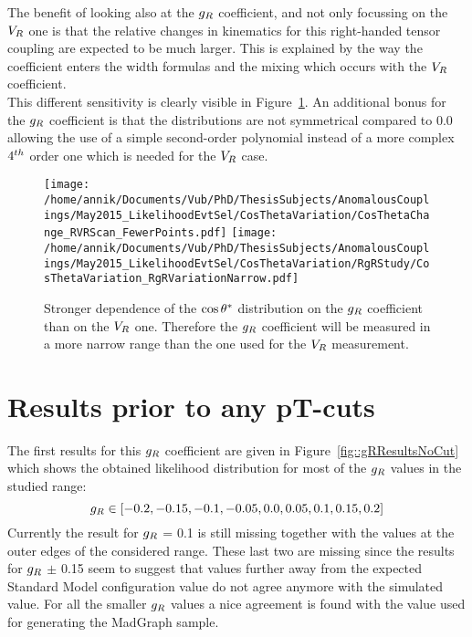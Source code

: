 The benefit of looking also at the $g_{R}$ coefficient, and not only focussing on the $V_{R}$ one is that the relative changes in kinematics for this right-handed tensor coupling are expected to be much larger. This is explained by the way the coefficient enters the width formulas and the mixing which occurs with the $V_{R}$ coefficient.\\
This different sensitivity is clearly visible in Figure~\ref{fig::VRvsgR}. An additional bonus for the $g_{R}$ coefficient is that the distributions are not symmetrical compared to 0.0 allowing the use of a simple second-order polynomial instead of a more complex $4^{th}$ order one which is needed for the $V_{R}$ case.

\begin{figure}[h!t]
 \centering
 \texttt{[image: /home/annik/Documents/Vub/PhD/ThesisSubjects/AnomalousCouplings/May2015\_LikelihoodEvtSel/CosThetaVariation/CosThetaChange\_RVRScan\_FewerPoints.pdf]}
 \texttt{[image: /home/annik/Documents/Vub/PhD/ThesisSubjects/AnomalousCouplings/May2015\_LikelihoodEvtSel/CosThetaVariation/RgRStudy/CosThetaVariation\_RgRVariationNarrow.pdf]}
 \caption{Stronger dependence of the $\cos \theta^{*}$ distribution on the $g_{R}$ coefficient than on the $V_{R}$ one. Therefore the $g_{R}$ coefficient will be measured in a more narrow range than the one used for the $V_{R}$ measurement.}
 \label{fig::VRvsgR}
\end{figure}

\section{Results prior to any pT-cuts}

The first results for this $g_{R}$ coefficient are given in Figure~\ref{fig::gRResultsNoCut} which shows the obtained likelihood distribution for most of the $g_{R}$ values in the studied range:
\begin{equation}
 g_{R} \in \left[-0.2, -0.15, -0.1, -0.05, 0.0, 0.05, 0.1, 0.15, 0.2 \right]
\end{equation}
Currently the result for $g_{R}$ = 0.1 is still missing together with the values at the outer edges of the considered range. These last two are missing since the results for $g_{R}$ $\pm$ 0.15 seem to suggest that values further away from the expected Standard Model configuration value do not agree anymore with the simulated value. For all the smaller $g_{R}$ values a nice agreement is found with the value used for generating the MadGraph sample.\\

